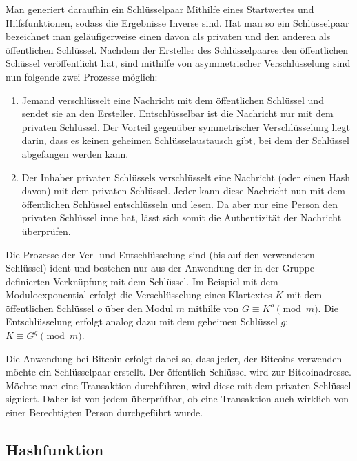 Man generiert daraufhin ein Schlüsselpaar Mithilfe eines Startwertes und Hilfsfunktionen, sodass die Ergebnisse Inverse sind.
Hat man so ein Schlüsselpaar bezeichnet man geläufigerweise einen davon als privaten und den anderen als öffentlichen Schlüssel.
Nachdem der Ersteller des Schlüsselpaares den öffentlichen Schüssel veröffentlicht hat, sind mithilfe von asymmetrischer Verschlüsselung sind nun folgende zwei Prozesse möglich:
\begin{enumerate}
    \item Jemand verschlüsselt eine Nachricht mit dem öffentlichen Schlüssel und sendet sie an den Ersteller.
    Entschlüsselbar ist die Nachricht nur mit dem privaten Schlüssel.
    Der Vorteil gegenüber symmetrischer Verschlüsselung liegt darin, dass es keinen geheimen Schlüsselaustausch gibt, bei dem der Schlüssel abgefangen werden kann.
    \item Der Inhaber privaten Schlüssels verschlüsselt eine Nachricht (oder einen Hash davon) mit dem privaten Schlüssel.
    Jeder kann diese Nachricht nun mit dem öffentlichen Schlüssel entschlüsseln und lesen.
    Da aber nur eine Person den privaten Schlüssel inne hat, lässt sich somit die Authentizität der Nachricht überprüfen.
\end{enumerate}

Die Prozesse der Ver- und Entschlüsselung sind (bis auf den verwendeten Schlüssel) ident und bestehen nur aus der Anwendung der in der Gruppe definierten Verknüpfung mit dem Schlüssel.
Im Beispiel mit dem Moduloexponential erfolgt die Verschlüsselung eines Klartextes $K$ mit dem öffentlichen Schlüssel $o$ über den Modul $m$ mithilfe von $G \equiv K^o \pmod{m}$.
Die Entschlüsselung erfolgt analog dazu mit dem geheimen Schlüssel $g$: $K \equiv G^g \pmod{m}$.

Die Anwendung bei Bitcoin erfolgt dabei so, dass jeder, der Bitcoins verwenden möchte ein Schlüsselpaar erstellt.
Der öffentlich Schlüssel wird zur Bitcoinadresse.
Möchte man eine Transaktion durchführen, wird diese mit dem privaten Schlüssel signiert.
Daher ist von jedem überprüfbar, ob eine Transaktion auch wirklich von einer Berechtigten Person durchgeführt wurde.

\subsection{Hashfunktion}

